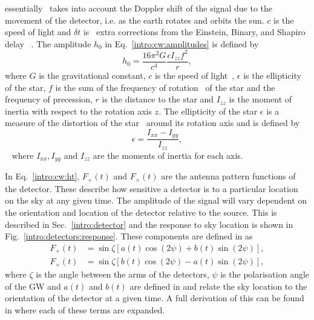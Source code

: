 essentially~ takes into account the Doppler shift of the
signal due to the movement of the detector, i.e. as the earth rotates and
orbits the sun. $c$ is the speed of light and $\delta t$ is~
extra corrections from the Einstein, Binary, and Shapiro delay
\citep{}~. The amplitude
$h_0$ in Eq.~\ref{intro:cw:amplitudes} is defined by
%
\begin{equation}
    h_0 = \frac{16 \pi^2 G}{c^4} \frac{\epsilon I_{zz} f^2}{r},
\end{equation}
%
where $G$ is the gravitational constant, $c$ is the speed of light~, $\epsilon$ is the ellipticity of the star, $f$
is the sum of the frequency of rotation~ of the star and the
frequency of precession, $r$ is the distance to the star and $I_{zz}$ is the
moment of inertia with respect to the rotation axis $z$.  The ellipticity of
the star $\epsilon$ is a measure of the distortion of the star~ around its rotation axis and is defined by
%
\begin{equation}
    \epsilon = \frac{I_{xx} - I_{yy}}{I_{zz}},
\end{equation}
%
~ where $I_{xx}, I_{yy}$ and
$I_{zz}$ are the moments of inertia for each axis.

In Eq.~\ref{intro:cw:ht}, $F_+(t)$ and $F_{\times}(t)$ are the antenna pattern
functions of the detector.  These describe how sensitive a detector is to a
particular location on the sky at any given time.  The amplitude of the signal
will vary dependent on the orientation and location of the detector relative to
the source.  This is described in Sec.~\ref{intro:detector} and the response to
sky location is shown in Fig.~\ref{intro:detectors:response}.  These components
are defined in \citep{schutz1998DataAnalysis} as
%
\begin{equation}
\label{intro:cw:antenna}
\begin{split}
F_{+}(t) &= \sin{\zeta}[a(t)\cos{(2\psi)} + b(t)\sin{(2\psi)}], \\
F_{\times}(t) &= \sin{\zeta}[b(t) \cos{(2\psi)} - a(t)\sin{(2\psi)}],
\end{split}
\end{equation}
%
where $\zeta$ is the angle between the arms of the detectors, $\psi$ is the
polarisation angle of the \gls{GW} and $a(t)$ and $b(t)$ are defined in
\citep{schutz1998DataAnalysis} and relate the sky location to the orientation
of the detector at a given time.  A full derivation of this can be found in
\citep{schutz1998DataAnalysis} where each of these terms are expanded.

